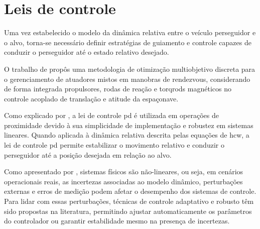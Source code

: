 \section{Leis de controle}
\label{sec_estrategias_controle}

Uma vez estabelecido o modelo da dinâmica relativa entre o veículo perseguidor e o alvo, torna-se necessário definir estratégias de guiamento e controle capazes de conduzir o perseguidor até o estado relativo desejado.


O trabalho de \cite{santos2015mixed} propôs uma metodologia de otimização multiobjetivo discreta para o gerenciamento de atuadores mistos em manobras de rendezvous, considerando de forma integrada propulsores, rodas de reação e torqrods magnéticos no controle acoplado de translação e atitude da espaçonave.


Como explicado por \cite{qi2022variable}, a lei de controle \gls{pd} é utilizada em operações de proximidade devido à sua simplicidade de implementação e robustez em sistemas lineares.
Quando aplicada à dinâmica relativa descrita pelas equações de \gls{hcw}, a lei de controle \gls{pd} permite estabilizar o movimento relativo e conduzir o perseguidor até a posição desejada em relação ao alvo.


Como apresentado por \cite{slotine1991applied}, sistemas físicos são não-lineares, ou seja, em cenários operacionais reais, as incertezas associadas ao modelo dinâmico, perturbações externas e erros de medição podem afetar o desempenho dos sistemas de controle.
Para lidar com essas perturbações, técnicas de controle adaptativo e robusto têm sido propostas na literatura, permitindo ajustar automaticamente os parâmetros do controlador ou garantir estabilidade mesmo na presença de incertezas.